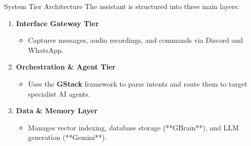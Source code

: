 \documentclass[10pt]{beamer}
\begin{document}
\begin{frame}{System Tier Architecture}
  The assistant is structured into three main layers:
  \begin{enumerate}
    \item \textbf{Interface Gateway Tier}
      \begin{itemize}
        \item Captures messages, audio recordings, and commands via Discord and WhatsApp.
      \end{itemize}
    \item \textbf{Orchestration \& Agent Tier}
      \begin{itemize}
        \item Uses the \textbf{GStack} framework to parse intents and route them to target specialist AI agents.
      \end{itemize}
    \item \textbf{Data \& Memory Layer}
      \begin{itemize}
        \item Manages vector indexing, database storage (**GBrain**), and LLM generation (**Gemini**).
      \end{itemize}
  \end{enumerate}
\end{frame}
\end{document}

